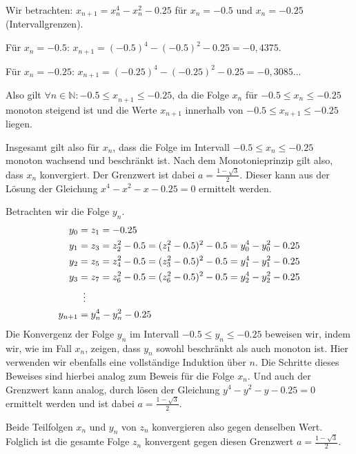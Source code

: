 \documentclass[a4paper, 12pt]{book}
\begin{document}
\begin{itemize}
\begin{itemize}
\begin{enumerate}
Wir betrachten:
\(x_{n + 1} = x_{n}^{4} - x_{n}^{2} -0.25\) für
\(x_{n} =  -0.5\) und \(x_{n} =  -0.25\) (Intervallgrenzen).

Für \(x_{n} =  -0.5\):
\(x_{n + 1} = (-0.5)^{4} - (-0.5)^{2} - 0.25 =  -0,4375\).

Für \(x_{n} =  -0.25\):
\(x_{n + 1} = ( -0.25)^{4} - ( -0.25)^{2} - 0.25 =  -0,3085...\)

Also gilt
\(\forall n \in \mathbb{N}: -0.5{\leq x}_{n + 1} \leq  -0.25\),
da die Folge \(x_{n}\) für
\(-0.5\leq x_{n} \leq  -0.25\) monoton steigend ist und
die Werte \({x}_{n + 1}\) innerhalb von
\(-0.5\leq x_{n + 1} \leq  -0.25\) liegen.

Insgesamt gilt also für \(x_{n}\), dass die Folge im Intervall
\(-0.5\leq x_{n} \leq  -0.25\) monoton wachsend und
beschränkt ist. Nach dem Monotonieprinzip gilt
also, dass \(x_{n}\) konvergiert. Der Grenzwert ist dabei
\(a = \frac{1 - \sqrt{3}}{2}\). Dieser kann aus der Lösung der
Gleichung \(x^{4} - x^{2} - x - 0.25 = 0\) ermittelt
werden.

\end{enumerate}
\end{itemize}
\end{itemize}

Betrachten wir die Folge \(y_{n}\).
\begin{align*}
y_{0} &= z_{1} =  -0.25\\
y_{1} &= z_{3} = z_{2}^{2} - 0.5 = (z_{1}^{2} - 0.5)^{2} - 0.5 = y_{0}^{4} - y_{0}^{2} - 0.25\\
y_{2} &= z_{5} = z_{4}^{2} - 0.5 = (z_{3}^{2} - 0.5)^{2} - 0.5 = y_{1}^{4} - y_{1}^{2} - 0.25\\
y_{3} &= z_{7} = z_{6}^{2} - 0.5 = (z_{6}^{2} - 0.5)^{2} - 0.5 = y_{2}^{4} - y_{2}^{2} - 0.25\\
&\vdotswithin{=}\\
y_{n + 1} &= y_{n}^{4} - y_{n}^{2} - 0.25
\end{align*}
Die Konvergenz der Folge \(y_{n}\) im Intervall
\(-0.5\leq y_{n} \leq  - 0.25\) beweisen wir, indem wir,
wie im Fall \(x_{n}\), zeigen, dass \(y_{n}\) sowohl beschränkt als auch
monoton ist. Hier verwenden wir ebenfalls eine vollständige Induktion
über $n$. Die Schritte dieses Beweises sind hierbei analog zum Beweis für
die Folge \(x_{n}\). Und auch der Grenzwert kann analog, durch lösen der
Gleichung \(y^{4} - y^{2} - y - 0.25 = 0\) ermittelt
werden und ist dabei \(a = \frac{1 - \sqrt{3}}{2}\).

Beide Teilfolgen \(x_{n}\) und \(y_{n}\) von \(z_{n}\) konvergieren also
gegen denselben Wert. Folglich ist die gesamte Folge \(z_{n}\)
konvergent gegen diesen Grenzwert \(a = \frac{1 - \sqrt{3}}{2}\).
\end{document}

